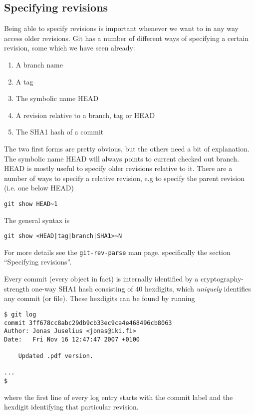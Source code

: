 \documentclass[a4paper,10pt]{article}
\begin{document}
\subsection{Specifying revisions}
\label{sec:revision}
Being able to specify revisions is important whenever we want to in any way 
access older revisions. Git has a number of different ways of specifying a
certain revision, some which we have seen already:
\begin{enumerate}
  \item A branch name
  \item A tag
  \item The symbolic name HEAD
  \item A revision relative to a branch, tag or HEAD
  \item The SHA1 hash of a commit	
\end{enumerate}
The two first forms are pretty obvious, but the others need a bit of
explanation. The symbolic name HEAD will always points to current
checked out branch.  HEAD is mostly useful to specify
older revisions relative to it. There are a number of ways to specify
a relative revision, e.g to specify the parent revision (i.e. one below HEAD)
\begin{verbatim}
git show HEAD~1
\end{verbatim}
The general syntax is
\begin{verbatim}
git show <HEAD|tag|branch|SHA1>~N
\end{verbatim}
For more details see the \texttt{git-rev-parse} man page,
specifically the section ``Specifying revisions''.

Every commit (every object in fact) is internally identified by a
cryptography-strength one-way SHA1 hash consisting of 40 hexdigits, which
\emph{uniquely} identifies any commit (or file). These hexdigits can be found
by running 
\begin{verbatim}
$ git log
commit 3ff678cc8abc29db9cb33ec9ca4e468496cb8063
Author: Jonas Juselius <jonas@iki.fi>
Date:   Fri Nov 16 12:47:47 2007 +0100

    Updated .pdf version.

...
$
\end{verbatim}
where the first line of every log entry starts with the commit label and the
hexdigit identifying that particular revision.
\end{document}
